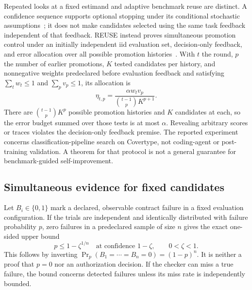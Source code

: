 Repeated looks at a fixed estimand and adaptive benchmark reuse are distinct. A confidence sequence supports optional stopping under its conditional stochastic assumptions~\cite{ch02_confseq2021}; it does not make candidates selected using the same task feedback independent of that feedback. REUSE instead proves simultaneous promotion control under an initially independent iid evaluation set, decision-only feedback, and error allocation over all possible promotion histories~\cite{ch02_reuse2026}. With $t$ the round, $p$ the number of earlier promotions, $K$ tested candidates per history, and nonnegative weights predeclared before evaluation feedback and satisfying $\sum_t w_t\leq1$ and $\sum_p v_p\leq1$, its allocation is
\begin{equation}
 \eta_{t,p}=\frac{\alpha w_t v_p}{\binom{t-1}{p}K^{p+1}}.
\end{equation}
There are $\binom{t-1}{p}K^p$ possible promotion histories and $K$ candidates at each, so the error budget summed over those tests is at most $\alpha$. Revealing arbitrary scores or traces violates the decision-only feedback premise. The reported experiment concerns classification-pipeline search on Covertype, not coding-agent or post-training validation. A theorem for that protocol is not a general guarantee for benchmark-guided self-improvement.

\subsection{Simultaneous evidence for fixed candidates}\label{sec:C02:simultaneous}
Let $B_i\in\{0,1\}$ mark a declared, observable contract failure in a fixed evaluation configuration. If the trials are independent and identically distributed with failure probability $p$, zero failures in a predeclared sample of size $n$ gives the exact one-sided upper bound
\begin{equation}
 p\leq1-\zeta^{1/n}
 \quad\text{at confidence }1-\zeta,\qquad 0<\zeta<1.
\end{equation}
This follows by inverting $\Pr_p(B_1=\cdots=B_n=0)=(1-p)^n$. It is neither a proof that $p=0$ nor an authorization decision. If the checker can miss a true failure, the bound concerns detected failures unless its miss rate is independently bounded.

